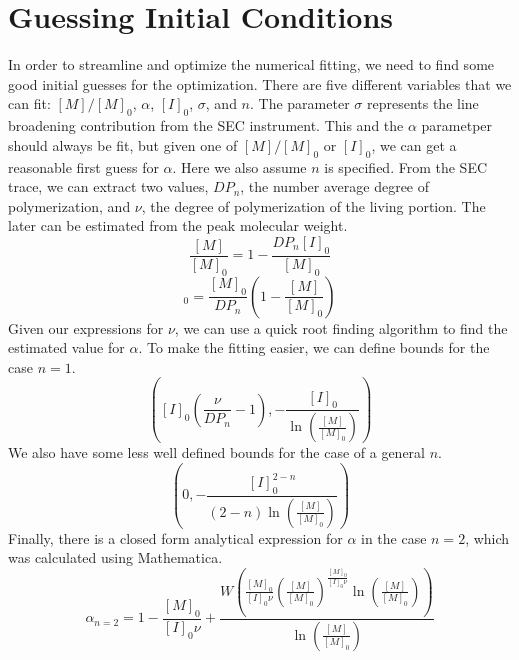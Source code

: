\documentclass[12pt]{article}
\begin{document}
\section*{Guessing Initial Conditions}
In order to streamline and optimize the numerical fitting, we need to find some good initial guesses for the optimization. There are five different variables that we can fit: $[M]/[M]_0$, $\alpha$, $[I]_0$, $\sigma$, and $n$. The parameter $\sigma$ represents the line broadening contribution from the SEC instrument. This and the $\alpha$ parametper should always be fit, but given one of $[M]/[M]_0$ or $[I]_0$, we can get a reasonable first guess for $\alpha$. Here we also assume $n$ is specified. From the SEC trace, we can extract two values, $DP_n$, the number average degree of polymerization, and $\nu$, the degree of polymerization of the living portion. The later can be estimated from the peak molecular weight.
\begin{equation}
  \frac{[M]}{[M]_0}=1-\frac{DP_n[I]_0}{[M]_0}
\end{equation}
\begin{equation}
  [I]_0=\frac{[M]_0}{DP_n}\left(1-\frac{[M]}{[M]_0}\right)
\end{equation}
Given our expressions for $\nu$, we can use a quick root finding algorithm to find the estimated value for $\alpha$. To make the fitting easier, we can define bounds for the case $n=1$.
\begin{equation}
  \left([I]_0\left(\frac{\nu}{DP_n}-1\right),-\frac{[I]_0}{\ln\left(\frac{[M]}{[M]_0}\right)}\right)
\end{equation}
We also have some less well defined bounds for the case of a general $n$.
\begin{equation}
  \left(0,-\frac{[I]_0^{2-n}}{(2-n)\ln\left(\frac{[M]}{[M]_0}\right)}\right)
\end{equation}
Finally, there is a closed form analytical expression for $\alpha$ in the case $n=2$, which was calculated using Mathematica.
\begin{equation}
  \alpha_{n=2}=1-\frac{[M]_0}{[I]_0\nu}+\frac{W\left(\frac{[M]_0}{[I]_0\nu}\left(\frac{[M]}{[M]_0}\right)^{\frac{[M]_0}{[I]_0\nu}}\ln\left(\frac{[M]}{[M]_0}\right)\right)}{\ln\left(\frac{[M]}{[M]_0}\right)}
\end{equation}
\end{document}
